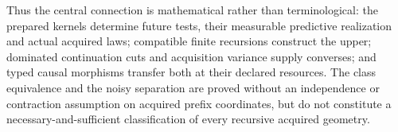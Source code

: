 Thus the central connection is mathematical rather than terminological: the prepared kernels determine future tests, their measurable predictive realization and actual acquired laws; compatible finite recursions construct the upper; dominated continuation cuts and acquisition variance supply converses; and typed causal morphisms transfer both at their declared resources. The class equivalence and the noisy separation are proved without an independence or contraction assumption on acquired prefix coordinates, but do not constitute a necessary-and-sufficient classification of every recursive acquired geometry.
